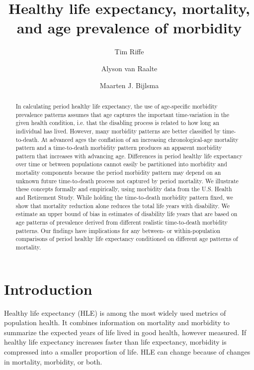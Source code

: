 \documentclass[11pt,oneside,a4paper]{article} %
\begin{document}
\title{Healthy life expectancy, mortality, and age prevalence of morbidity}

\author[1]{Tim Riffe}
\author[1]{Alyson van Raalte}
\author[1]{Maarten J. Bijlsma}


\maketitle

\begin{abstract}
In calculating period healthy life expectancy, the use of age-specific morbidity prevalence patterns assumes that age captures the important time-variation in the given health condition, i.e. that the disabling process is related to how long an individual has lived. However, many morbidity patterns are better classified by time-to-death. At advanced ages the conflation of an increasing chronological-age mortality pattern and a time-to-death morbidity pattern produces an apparent morbidity pattern that increases with advancing age. Differences in period healthy life expectancy over time or between populations cannot easily be partitioned into morbidity and mortality components because
the period morbidity pattern may depend on an unknown future time-to-death
process not captured by period mortality. We illustrate these concepts formally
and empirically, using morbidity data from the U.S. Health and Retirement Study.
While holding the time-to-death morbidity pattern fixed, we show that mortality
reduction alone reduces the total life years with disability. We estimate an
upper bound of bias in estimates of disability life years that are based on age
patterns of prevalence derived from different realistic time-to-death morbidity
patterns.
Our findings have implications for any between- or within-population
comparisons of period healthy life expectancy conditioned on different age patterns of mortality.
\end{abstract}

\section{Introduction}

Healthy life expectancy (HLE) is among the most widely used metrics of
population health. It combines information on mortality and morbidity to
summarize the expected years of life lived in good health, however measured. If
healthy life expectancy increases faster than life expectancy, morbidity is
compressed into a smaller proportion of life. HLE can change because of changes in mortality, morbidity, or both.
\end{document}
